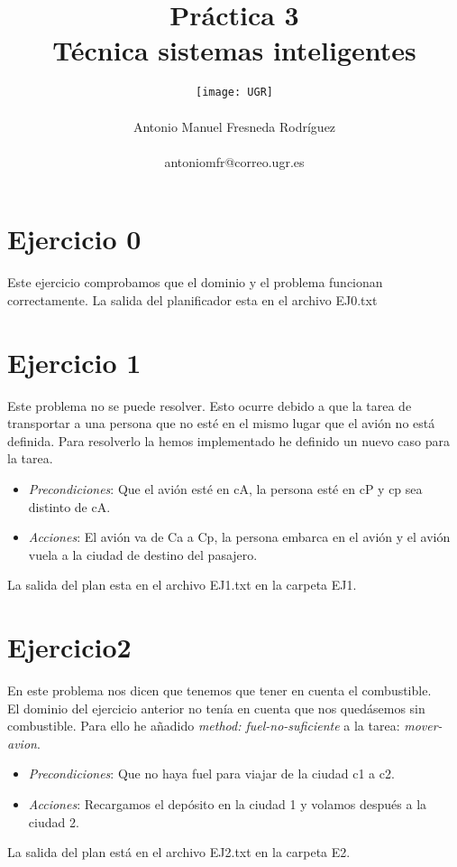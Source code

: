\documentclass[10pt,spanish]{article}
\author{
	\texttt{[image: UGR]} \\\\
	\Large 	Antonio Manuel Fresneda Rodríguez\\
	\\antoniomfr@correo.ugr.es
	\\
}
\date{}
\title{\huge \textbf{Práctica 3\\ Técnica sistemas inteligentes}}
\begin{document}
	\maketitle
	\pagebreak
	\tableofcontents
	\pagebreak
	\section{Ejercicio 0}
	Este ejercicio comprobamos que el dominio y el problema funcionan correctamente. La salida del planificador esta en el archivo EJ0.txt
	\section{Ejercicio 1}
	Este problema no se puede resolver. Esto ocurre debido a que la tarea de transportar a una persona que no esté en el mismo lugar que el avión no está definida.
	Para resolverlo la hemos implementado he definido un nuevo caso para la tarea.
	\begin{itemize}
		\item \textit {Precondiciones}: Que el avión esté en cA, la persona esté en cP y cp sea distinto de cA.
		\item \textit {Acciones}: El avión va de Ca a Cp, la persona embarca en el avión y el avión vuela a la ciudad de destino del pasajero.
	\end{itemize}
	La salida del plan esta en el archivo EJ1.txt en la carpeta EJ1.
	\section{Ejercicio2}
	En este problema nos dicen que tenemos que tener en cuenta el combustible.\\
	El dominio del ejercicio anterior no tenía en cuenta que nos quedásemos sin combustible. Para ello he añadido \textit{method: fuel-no-suficiente} a la tarea: \textit{mover-avion}.\\
		\begin{itemize}
			\item \textit{Precondiciones}: Que no haya fuel para viajar de la ciudad c1 a c2.
			\item \textit{Acciones}: Recargamos el depósito en la ciudad 1 y volamos después a la ciudad 2.
		\end{itemize}
	La salida del plan está en el archivo EJ2.txt en la carpeta E2.
\end{document}
